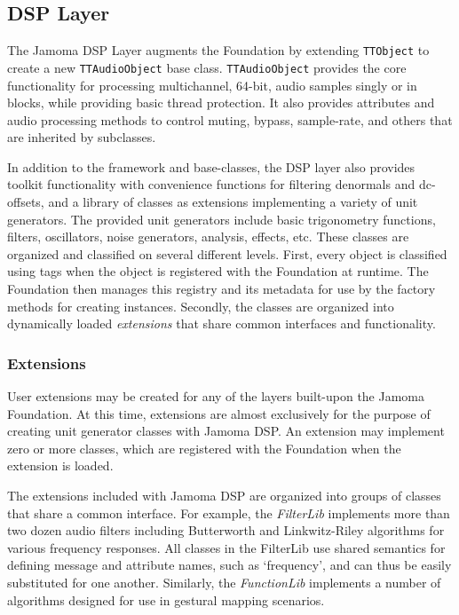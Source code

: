 \documentclass[twoside,10pt]{article}
\begin{document}


\subsection{DSP Layer} %

The Jamoma DSP Layer \cite{web9} augments the Foundation by extending \texttt{\small{TTObject}} to create a new \texttt{\small{TTAudioObject}} base class.  \texttt{\small{TTAudioObject}} provides the core functionality for processing multichannel, 64-bit, audio samples singly or in blocks, while providing basic thread protection.  It also provides attributes and audio processing methods to control muting, bypass, sample-rate, and others that are inherited by subclasses.

In addition to the framework and base-classes, the DSP layer also provides toolkit functionality with convenience functions for filtering denormals and dc-offsets, and a library of classes as extensions implementing a variety of unit generators.  The provided unit generators include basic trigonometry functions, filters, oscillators, noise generators, analysis, effects, etc.  These classes are organized and classified on several different levels.  First, every object is classified using tags when the object is registered with the Foundation at runtime.  The Foundation then manages this registry and its metadata for use by the factory methods for creating instances.  Secondly, the classes are organized into dynamically loaded \emph{extensions} that share common interfaces and functionality.

\subsubsection{Extensions}

User extensions may be created for any of the layers built-upon the Jamoma Foundation.  At this time, extensions are almost exclusively for the purpose of creating unit generator classes with Jamoma DSP. An extension may implement zero or more classes, which are registered with the Foundation when the extension is loaded.

The extensions included with Jamoma DSP are organized into groups of classes that share a common interface.  For example, the \emph{FilterLib} implements more than two dozen audio filters including Butterworth and Linkwitz-Riley algorithms for various frequency responses.  All classes in the FilterLib use shared semantics for defining message and attribute names, such as `frequency', and can thus be easily substituted for one another.  Similarly, the \emph{FunctionLib} implements a number of algorithms designed for use in gestural mapping scenarios.  
\end{document}
